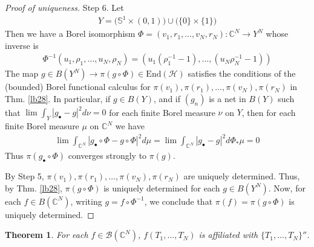 \documentclass[12pt,b5paper,notitlepage]{article}
\theoremstyle{definition}
\theoremstyle{plain}
\newtheorem{thm}[df]{Theorem}
\newcommand{\mc}{\mathcal}
\newcommand{\End}{\mathrm{End}} %
\newcommand{\scr}{\mathscr}
\newcommand{\mbb}{\mathbb}
\newcommand{\blt}{\bullet}
\newcommand{\Cbb}{\mathbb C}
\numberwithin{equation}{section}
\begin{document}
\begin{proof}[Proof of uniqueness]
Step 6. %
Let
\begin{align*}
Y=\big(\mbb S^1\times (0,1)\big)\cup \big(\{0\}\times \{1\}\big)
\end{align*}
Then we have a Borel isomorphism $\Phi=(v_1,r_1,\dots,v_N,r_N):\Cbb^N\rightarrow Y^N$ whose inverse is
\begin{align*}
\Phi^{-1}(u_1,\rho_1,\dots,u_N,\rho_N)=(u_1(\rho_1^{-1}-1),\dots,(u_N\rho_N^{-1}-1))
\end{align*}
The map $g\in B(Y^N)\rightarrow \pi(g\circ\Phi)\in\End(\mc H)$ satisfies the conditions of the (bounded) Borel functional calculus for $\pi(v_1),\pi(r_1),\dots,\pi(v_N),\pi(r_N)$ in Thm. \ref{lb28}. In particular, if $g\in B(Y)$, and if $(g_n)$ is a net in $B(Y)$ such that $\lim\int_Y |g_\blt-g|^2d\nu=0$ for each finite Borel measure $\nu$ on $Y$, then for each finite Borel measure $\mu$ on $\Cbb^N$ we have
\begin{align*}
\lim \int_{\Cbb^N}|g_\blt\circ\Phi-g\circ\Phi|^2d\mu=\lim \int_{\Cbb^N}|g_\blt-g|^2d\Phi_*\mu=0
\end{align*}
Thus $\pi(g_\blt\circ\Phi)$ converges strongly to $\pi(g)$.

By Step 5, $\pi(v_1),\pi(r_1),\dots,\pi(v_N),\pi(r_N)$ are uniquely determined. Thus, by Thm. \ref{lb28}, $\pi(g\circ\Phi)$ is uniquely determined for each $g\in B(Y^N)$. Now, for each $f\in B(\Cbb^N)$, writing $g=f\circ\Phi^{-1}$, we conclude that $\pi(f)=\pi(g\circ\Phi)$ is uniquely determined.
\end{proof}


\begin{thm}\label{lb50}
For each $f\in\scr B(\Cbb^N)$, $f(T_1,\dots,T_N)$ is affiliated with $\{T_1,\dots,T_N\}''$.
\end{thm}
\end{document}
